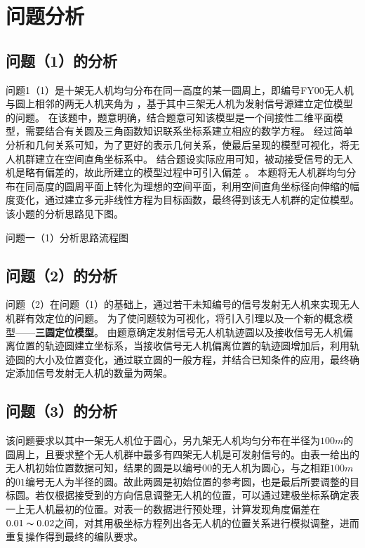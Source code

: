

\section{问题分析}

\subsection{问题（1）的分析}

问题1（1）是十架无人机均匀分布在同一高度的某一圆周上，即编号FY00无人机与圆上相邻的两无人机夹角为 ，基于其中三架无人机为发射信号源建立定位模型的问题。
在该题中，题意明确，结合题意可知该模型是一个间接性二维平面模型，需要结合有关圆及三角函数知识联系坐标系建立相应的数学方程。
经过简单分析和几何关系可知，为了更好的表示几何关系，使最后呈现的模型可视化，将无人机群建立在空间直角坐标系中。
结合题设实际应用可知，被动接受信号的无人机是略有偏差的，故此所建立的模型过程中可引入偏差 。
本题将无人机群均匀分布在同高度的圆周平面上转化为理想的空间平面，利用空间直角坐标径向伸缩的幅度变化，通过建立多元非线性方程为目标函数，最终得到该无人机群的定位模型。
该小题的分析思路见下图。

问题一（1）分析思路流程图

\subsection{问题（2）的分析}

问题（2）在问题（1）的基础上，通过若干未知编号的信号发射无人机来实现无人机群有效定位的问题。
为了使问题较为可视化，将引入引理以及一个新的概念模型——\textbf{三圆定位模型}。
由题意确定发射信号无人机轨迹圆以及接收信号无人机偏离位置的轨迹圆建立坐标系，当接收信号无人机偏离位置的轨迹圆增加后，利用轨迹圆的大小及位置变化，通过联立圆的一般方程，并结合已知条件的应用，最终确定添加信号发射无人机的数量为两架。

\subsection{问题（3）的分析}

该问题要求以其中一架无人机位于圆心，另九架无人机均匀分布在半径为$100m$的圆周上，且要求整个无人机群中最多有四架无人机是可发射信号的。由表一给出的无人机初始位置数据可知，结果的圆是以编号$00$的无人机为圆心，与之相距$100m$的$01$编号无人为半径的圆。故此两圆是初始位置的参考圆，也是最后所要调整的目标圆。若仅根据接受到的方向信息调整无人机的位置，可以通过建极坐标系确定表一上无人机最初的位置。对表一的数据进行预处理，计算发现角度偏差在$0.01 \thicksim 0.02$之间，对其用极坐标方程列出各无人机的位置关系进行模拟调整，进而重复操作得到最终的编队要求。


